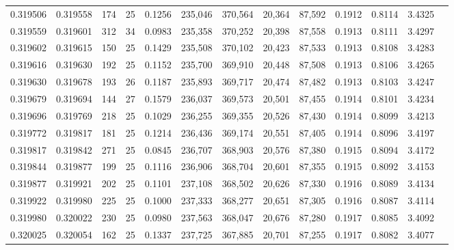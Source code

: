 \begin{tabular}{rrrrrrrrrrrrr}
0.319506 & 0.319558 &   174 &  25 &                                     0.1256 & 235,046 & 370,564 &  20,364 &  87,592 & 0.1912 & 0.8114 & 3.4325 \\
0.319559 & 0.319601 &   312 &  34 &                                     0.0983 & 235,358 & 370,252 &  20,398 &  87,558 & 0.1913 & 0.8111 & 3.4297 \\
0.319602 & 0.319615 &   150 &  25 &                                     0.1429 & 235,508 & 370,102 &  20,423 &  87,533 & 0.1913 & 0.8108 & 3.4283 \\
0.319616 & 0.319630 &   192 &  25 &                                     0.1152 & 235,700 & 369,910 &  20,448 &  87,508 & 0.1913 & 0.8106 & 3.4265 \\
0.319630 & 0.319678 &   193 &  26 &                                     0.1187 & 235,893 & 369,717 &  20,474 &  87,482 & 0.1913 & 0.8103 & 3.4247 \\
0.319679 & 0.319694 &   144 &  27 &                                     0.1579 & 236,037 & 369,573 &  20,501 &  87,455 & 0.1914 & 0.8101 & 3.4234 \\
0.319696 & 0.319769 &   218 &  25 &                                     0.1029 & 236,255 & 369,355 &  20,526 &  87,430 & 0.1914 & 0.8099 & 3.4213 \\
0.319772 & 0.319817 &   181 &  25 &                                     0.1214 & 236,436 & 369,174 &  20,551 &  87,405 & 0.1914 & 0.8096 & 3.4197 \\
0.319817 & 0.319842 &   271 &  25 &                                     0.0845 & 236,707 & 368,903 &  20,576 &  87,380 & 0.1915 & 0.8094 & 3.4172 \\
0.319844 & 0.319877 &   199 &  25 &                                     0.1116 & 236,906 & 368,704 &  20,601 &  87,355 & 0.1915 & 0.8092 & 3.4153 \\
0.319877 & 0.319921 &   202 &  25 &                                     0.1101 & 237,108 & 368,502 &  20,626 &  87,330 & 0.1916 & 0.8089 & 3.4134 \\
0.319922 & 0.319980 &   225 &  25 &                                     0.1000 & 237,333 & 368,277 &  20,651 &  87,305 & 0.1916 & 0.8087 & 3.4114 \\
0.319980 & 0.320022 &   230 &  25 &                                     0.0980 & 237,563 & 368,047 &  20,676 &  87,280 & 0.1917 & 0.8085 & 3.4092 \\
0.320025 & 0.320054 &   162 &  25 &                                     0.1337 & 237,725 & 367,885 &  20,701 &  87,255 & 0.1917 & 0.8082 & 3.4077 \\

\end{tabular}
